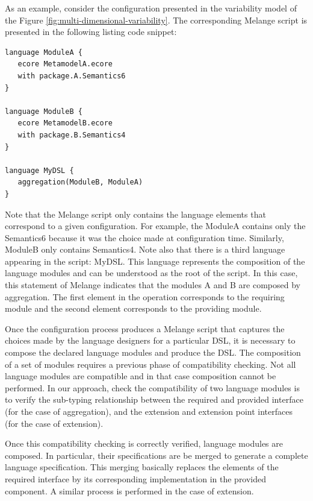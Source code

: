 As an example, consider the configuration presented in the variability model of the Figure \ref{fig:multi-dimensional-variability}. The corresponding Melange script is presented in the following listing code snippet:

\begin{lstlisting}
language ModuleA {
   ecore MetamodelA.ecore
   with package.A.Semantics6
}

language ModuleB {
   ecore MetamodelB.ecore
   with package.B.Semantics4
}

language MyDSL {
   aggregation(ModuleB, ModuleA)
}
\end{lstlisting}

Note that the Melange script only contains the language elements that correspond to a given configuration. For example, the ModuleA contains only the Semantics6 because it was the choice made at configuration time. Similarly, ModuleB only contains Semantics4. Note also that there is a third language appearing in the script: MyDSL. This language represents the composition of the language modules and can be understood as the root of the script. In this case, this statement of Melange indicates that the modules A and B are composed by aggregation. The first element in the operation corresponds to the requiring module and the second element corresponds to the providing module. 

Once the configuration process produces a Melange script that captures the choices made by the language designers for a particular DSL, it is necessary to compose the declared language modules and produce the DSL. The composition of a set of modules requires a previous phase of compatibility checking. Not all language modules are compatible and in that case composition cannot be performed. In our approach, check the compatibility of two language modules is to verify the sub-typing relationship between the required and provided interface (for the case of aggregation), and the extension and extension point interfaces (for the case of extension).

Once this compatibility checking is correctly verified, language modules are composed. In particular, their specifications are be merged to generate a complete language specification. This merging basically replaces the elements of the required interface by its corresponding implementation in the provided component. A similar process is performed in the case of extension. 